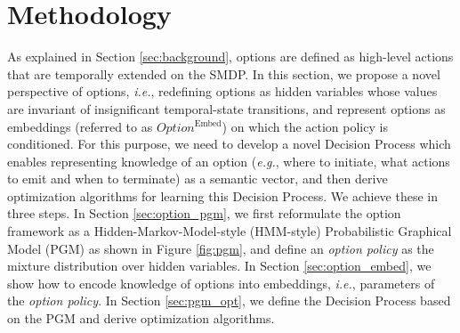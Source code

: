 \documentclass{article}
\newcommand{\red}[1]{\textcolor[HTML]{EB4335}{#1}}
\begin{document}
\vspace{-4mm}
\section{Methodology}
\label{sec:option}
\vspace{-3mm}
As explained in Section \ref{sec:background}, options are defined
as high-level actions that are temporally extended on the SMDP.
In this section, we propose a novel perspective of options,
  \textit{i.e.}, redefining options as hidden variables whose values are
  invariant of insignificant temporal-state transitions, and
  represent options as embeddings (referred to as
  $Option^{\textrm{Embed}}$) on which the action policy is conditioned.
For this purpose, we need to develop a novel Decision Process
which enables representing knowledge of an option (\textit{e.g.}, where to
initiate, what actions to emit and when to terminate) as a
semantic vector, and then derive optimization algorithms for
learning this Decision Process. We achieve these in three steps.
In Section \ref{sec:option_pgm}, we first reformulate the option
framework as a Hidden-Markov-Model-style (HMM-style)
Probabilistic Graphical Model (PGM)
\cite{koller2009probabilistic} as shown in Figure \ref{fig:pgm}, and define
an \emph{option policy} as the mixture distribution over hidden
variables. In Section \ref{sec:option_embed}, we show how to
encode knowledge of options into embeddings, \textit{i.e.}, parameters of
the \emph{option policy}. In Section \ref{sec:pgm_opt}, we define
the Decision Process based on the PGM and derive optimization
algorithms.
\end{document}
